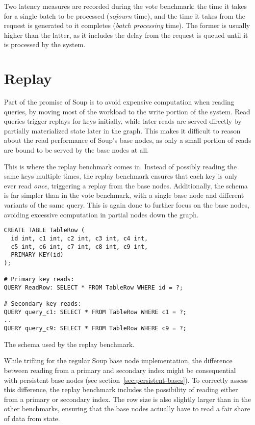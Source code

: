 Two latency measures are recorded during the vote benchmark: the time it takes
for a single batch to be processed (\textit{sojourn} time), and the time it
takes from the request is generated to it completes (\textit{batch processing}
time). The former is usually higher than the latter, as it includes the delay
from the request is queued until it is processed by the system.

\section{Replay}

Part of the promise of Soup is to avoid expensive computation when reading
queries, by moving most of the workload to the write portion of the system. Read
queries trigger replays for keys initially, while later reads are served
directly by partially materialized state later in the graph. This makes it
difficult to reason about the read performance of Soup's base nodes, as only a
small portion of reads are bound to be served by the base nodes at all.

This is where the replay benchmark comes in. Instead of possibly reading the
same keys multiple times, the replay benchmark ensures that each key is only
ever read \textit{once}, triggering a replay from the base nodes. Additionally,
the schema is far simpler than in the vote benchmark, with a single base node
and different variants of the same query. This is again done to further focus on
the base nodes, avoiding excessive computation in partial nodes down the graph.

\begin{listing}[H]
  \begin{verbatim}
CREATE TABLE TableRow (
  id int, c1 int, c2 int, c3 int, c4 int,
  c5 int, c6 int, c7 int, c8 int, c9 int,
  PRIMARY KEY(id)
);

# Primary key reads:
QUERY ReadRow: SELECT * FROM TableRow WHERE id = ?;

# Secondary key reads:
QUERY query_c1: SELECT * FROM TableRow WHERE c1 = ?;
..
QUERY query_c9: SELECT * FROM TableRow WHERE c9 = ?;
  \end{verbatim}

  \caption{The schema used by the replay benchmark.}\label{lst:replay}
\end{listing}

While trifling for the regular Soup base node implementation, the difference
between reading from a primary and secondary index might be consequential with
persistent base nodes (see section~\ref{sec:persistent-bases}). To correctly
assess this difference, the replay benchmark includes the possibility of reading
either from a primary or secondary index. The row size is also slightly larger
than in the other benchmarks, ensuring that the base nodes actually have to read
a fair share of data from state.

